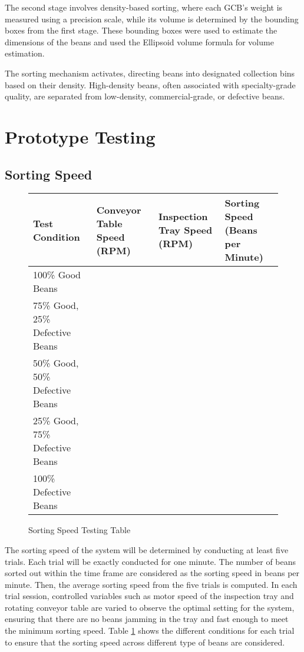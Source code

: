 The second stage involves density-based sorting, where each GCB's weight is measured using a precision scale, while its volume is determined by the bounding boxes from the first stage. These bounding boxes were used to estimate the dimensions of the beans and used the Ellipsoid volume formula for volume estimation.  

The sorting mechanism activates, directing beans into designated collection bins based on their density. High-density beans, often associated with specialty-grade quality, are separated from low-density, commercial-grade, or defective beans. 

\section{Prototype Testing}

\subsection{Sorting Speed}

\begin{figure}[H]
	\centering
	\begin{tabularx}{\textwidth}{p{}|p{}|p{}|p{}}
		\caption{Sorting Speed Testing Table} \label{tab:sorting_speed} \\
		\hline \hline
		\textbf{Test Condition} & \textbf{Conveyor Table Speed (RPM)} & \textbf{Inspection Tray Speed (RPM)} & \textbf{Sorting Speed (Beans per Minute)} \\
		\hline
		100\% Good Beans &  &  &  \\
		\hline
		75\% Good, 25\% Defective Beans &  &  &  \\
		\hline
		50\% Good, 50\% Defective Beans &  &  &  \\
		\hline
		25\% Good, 75\% Defective Beans &  &  &  \\
		\hline
		100\% Defective Beans &  &  &  \\
		\hline
	\end{tabularx}
\end{figure}

The sorting speed of the system will be determined by conducting at least five trials. Each trial will be exactly conducted for one minute. The number of beans sorted out within the time frame are considered as the sorting speed in beans per minute. Then, the average sorting speed from the five trials is computed. In each trial session, controlled variables such as motor speed of the inspection tray and rotating conveyor table are varied to observe the optimal setting for the system, ensuring that there are no beans jamming in the tray and fast enough to meet the minimum sorting speed. Table \ref{tab:sorting_speed} shows the different conditions for each trial to ensure that the sorting speed across different type of beans are considered. 

